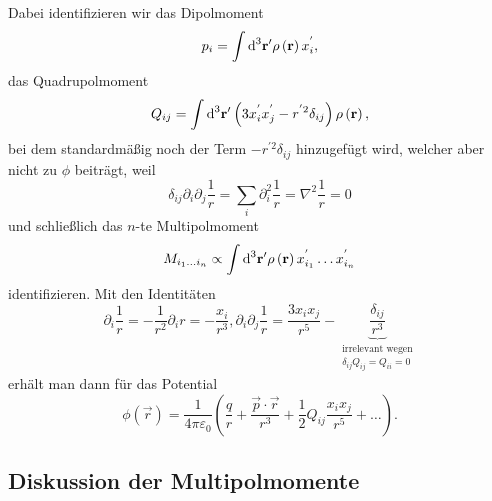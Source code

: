 Dabei identifizieren wir das Dipolmoment
\begin{equation*}
	p_{i}=\int \text{d} ^{3}\mathbf{r}'\rho \left(\mathbf{r}\right)x_{i}^{'},
\end{equation*}
das Quadrupolmoment
\begin{equation*}
	Q_{ij}=\int \text{d} ^{3}\mathbf{r}'\left(3x_{i}^{'}x_{j}^{'}-r^{'2}\delta _{ij}\right)\rho \left(\mathbf{r}\right),
\end{equation*}
bei dem standardmäßig noch der Term $-r^{'2}\delta _{ij}$ hinzugefügt wird, welcher aber nicht zu $\phi $ beiträgt, weil
\begin{equation*}
	\delta _{ij}\partial _{i}\partial _{j}\frac{1}{r}=\sum _{i}\partial _{i}^{2}\frac{1}{r}=\nabla ^{2}\frac{1}{r}=0
\end{equation*}
und schließlich das $n$-te Multipolmoment
\begin{equation*}
	M_{{i_{1}}\ldots {i_{n}}}\propto \int \text{d} ^{3}\mathbf{r}'\rho \left(\mathbf{r}\right)x_{i_{1}}^{'}\ldots x_{i_{n}}^{'}
\end{equation*}
identifizieren. Mit den Identitäten
\begin{equation*}
	\partial _{i}\frac{1}{r}=-\frac{1}{r^{2}}\partial _{i}r=-\frac{x_{i}}{r^{3}}, \partial _{i}\partial _{j}\frac{1}{r}=\frac{3x_{i}x_{j}}{r^{5}}-\underset{\substack{
			\text{irrelevant wegen} \\
			\delta _{ij}Q_{ij}=Q_{ii}=0
		}}{\underbrace{\frac{\delta _{ij}}{r^{3}}}}
\end{equation*}
erhält man dann für das Potential
\begin{equation*}
	\phi \left(\vec {r}\right)=\frac{1}{4\pi \varepsilon _{0}}\left(\frac{q}{r}+\frac{\vec {p}\cdot \vec {r}}{r^{3}}+\frac{1}{2}Q_{ij}\frac{x_{i}x_{j}}{r^{5}}+\ldots \right).
\end{equation*}
\subsection{Diskussion der Multipolmomente\label{ref-033}}

